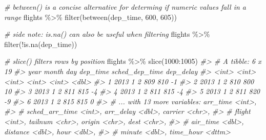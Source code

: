 \documentclass[
]{book}
\newenvironment{Shaded}{\begin{snugshade}}{\end{snugshade}}
\newcommand{\CommentTok}[1]{\textcolor[rgb]{0.56,0.35,0.01}{\textit{#1}}}
\newcommand{\DecValTok}[1]{\textcolor[rgb]{0.00,0.00,0.81}{#1}}
\newcommand{\FunctionTok}[1]{\textcolor[rgb]{0.00,0.00,0.00}{#1}}
\newcommand{\NormalTok}[1]{#1}
\newcommand{\SpecialCharTok}[1]{\textcolor[rgb]{0.00,0.00,0.00}{#1}}
\begin{document}
\begin{Shaded}
\begin{Highlighting}[]
\CommentTok{\# between() is a concise alternative for determing if numeric values fall in a range}
\NormalTok{flights }\SpecialCharTok{\%\textgreater{}\%} \FunctionTok{filter}\NormalTok{(}\FunctionTok{between}\NormalTok{(dep\_time, }\DecValTok{600}\NormalTok{, }\DecValTok{605}\NormalTok{))}

\CommentTok{\# side note: is.na() can also be useful when filtering}
\NormalTok{flights }\SpecialCharTok{\%\textgreater{}\%} \FunctionTok{filter}\NormalTok{(}\SpecialCharTok{!}\FunctionTok{is.na}\NormalTok{(dep\_time))}
\end{Highlighting}
\end{Shaded}

\begin{Shaded}
\begin{Highlighting}[]
\CommentTok{\# slice() filters rows by position}
\NormalTok{flights }\SpecialCharTok{\%\textgreater{}\%} \FunctionTok{slice}\NormalTok{(}\DecValTok{1000}\SpecialCharTok{:}\DecValTok{1005}\NormalTok{)}
\CommentTok{\#\textgreater{} \# A tibble: 6 x 19}
\CommentTok{\#\textgreater{}    year month   day dep\_time sched\_dep\_time dep\_delay}
\CommentTok{\#\textgreater{}   \textless{}int\textgreater{} \textless{}int\textgreater{} \textless{}int\textgreater{}    \textless{}int\textgreater{}          \textless{}int\textgreater{}     \textless{}dbl\textgreater{}}
\CommentTok{\#\textgreater{} 1  2013     1     2      809            810        {-}1}
\CommentTok{\#\textgreater{} 2  2013     1     2      810            800        10}
\CommentTok{\#\textgreater{} 3  2013     1     2      811            815        {-}4}
\CommentTok{\#\textgreater{} 4  2013     1     2      811            815        {-}4}
\CommentTok{\#\textgreater{} 5  2013     1     2      811            820        {-}9}
\CommentTok{\#\textgreater{} 6  2013     1     2      815            815         0}
\CommentTok{\#\textgreater{} \# ... with 13 more variables: arr\_time \textless{}int\textgreater{},}
\CommentTok{\#\textgreater{} \#   sched\_arr\_time \textless{}int\textgreater{}, arr\_delay \textless{}dbl\textgreater{}, carrier \textless{}chr\textgreater{},}
\CommentTok{\#\textgreater{} \#   flight \textless{}int\textgreater{}, tailnum \textless{}chr\textgreater{}, origin \textless{}chr\textgreater{}, dest \textless{}chr\textgreater{},}
\CommentTok{\#\textgreater{} \#   air\_time \textless{}dbl\textgreater{}, distance \textless{}dbl\textgreater{}, hour \textless{}dbl\textgreater{},}
\CommentTok{\#\textgreater{} \#   minute \textless{}dbl\textgreater{}, time\_hour \textless{}dttm\textgreater{}}


\end{Highlighting}
\end{Shaded}
\end{document}
